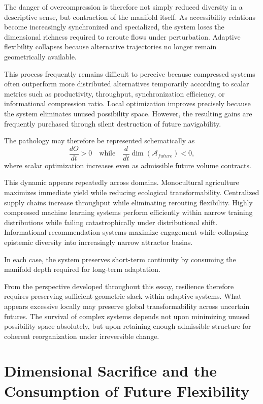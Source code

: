 \documentclass[11pt,a4paper]{article}
\newcommand{\Aspace}{\mathcal{A}}
\begin{document}
The danger of overcompression is therefore not simply reduced diversity in a descriptive sense, but contraction of the manifold itself. As accessibility relations become increasingly synchronized and specialized, the system loses the dimensional richness required to reroute flows under perturbation. Adaptive flexibility collapses because alternative trajectories no longer remain geometrically available.

This process frequently remains difficult to perceive because compressed systems often outperform more distributed alternatives temporarily according to scalar metrics such as productivity, throughput, synchronization efficiency, or informational compression ratio. Local optimization improves precisely because the system eliminates unused possibility space. However, the resulting gains are frequently purchased through silent destruction of future navigability.

The pathology may therefore be represented schematically as
\[
\frac{dO}{dt}>0
\quad \text{while} \quad
\frac{d}{dt}\dim(\Aspace_{future})<0,
\]
where scalar optimization increases even as admissible future volume contracts.

This dynamic appears repeatedly across domains. Monocultural agriculture maximizes immediate yield while reducing ecological transformability. Centralized supply chains increase throughput while eliminating rerouting flexibility. Highly compressed machine learning systems perform efficiently within narrow training distributions while failing catastrophically under distributional shift. Informational recommendation systems maximize engagement while collapsing epistemic diversity into increasingly narrow attractor basins.

In each case, the system preserves short-term continuity by consuming the manifold depth required for long-term adaptation.

From the perspective developed throughout this essay, resilience therefore requires preserving sufficient geometric slack within adaptive systems. What appears excessive locally may preserve global transformability across uncertain futures. The survival of complex systems depends not upon minimizing unused possibility space absolutely, but upon retaining enough admissible structure for coherent reorganization under irreversible change.

\newpage

\section{Dimensional Sacrifice and the Consumption of Future Flexibility}
\end{document}
